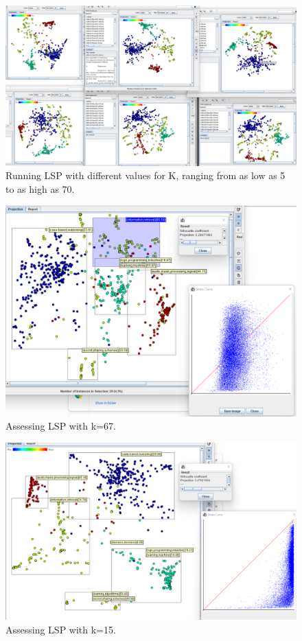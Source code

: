 \documentclass[ 10pt ]{fphw}
\begin{document}
\begin{center}
\begin{figure}[H]
    \centering
	\includegraphics[width=0.85\columnwidth]{lspVaryingKTest.png} 
	\caption{Running LSP with different values for K, ranging from as low as 5 to as high as 70.}
	\label{fig:lspvarying}
	\end{figure}
\end{center}

\begin{center}
\begin{figure}[H]
    \centering
	\includegraphics[width=0.55\columnwidth]{LSPtext.png} 
	\caption{Assessing LSP with k=67.}
	\label{fig:lspk67}
	\end{figure}
\end{center}

\begin{center}
\begin{figure}[H]
    \centering
	\includegraphics[width=0.55\columnwidth]{LSPtext15classes.png} 
	\caption{Assessing LSP with k=15.}
	\label{fig:lspk15}
	\end{figure}
\end{center}
\end{document}
